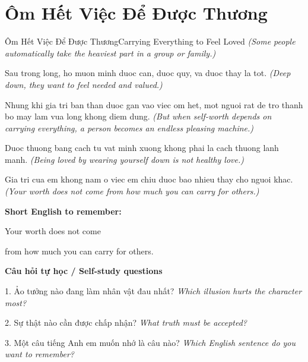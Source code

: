 \section{Ôm Hết Việc Để Được Thương}
\begin{truyen}{Ôm Hết Việc Để Được Thương}{Carrying Everything to Feel Loved}
\textit{(Some people automatically take the heaviest part in a group or family.)}

Sau trong long, ho muon minh duoc can, duoc quy, va duoc thay la tot.
\textit{(Deep down, they want to feel needed and valued.)}

Nhung khi gia tri ban than duoc gan vao viec om het, mot nguoi rat de tro thanh bo may lam vua long khong diem dung.
\textit{(But when self-worth depends on carrying everything, a person becomes an endless pleasing machine.)}

Duoc thuong bang cach tu vat minh xuong khong phai la cach thuong lanh manh.
\textit{(Being loved by wearing yourself down is not healthy love.)}

\end{truyen}

\begin{baihoc}
Gia tri cua em khong nam o viec em chiu duoc bao nhieu thay cho nguoi khac.
\textit{(Your worth does not come from how much you can carry for others.)}
\end{baihoc}

\begin{ghinhoanh}
\textbf{Short English to remember:}

Your worth does not come

from how much you can carry for others.

\end{ghinhoanh}

\begin{tuhocnhanh}
\textbf{Câu hỏi tự học / Self-study questions}

1. Ảo tưởng nào đang làm nhân vật đau nhất? \textit{Which illusion hurts the character most?}

2. Sự thật nào cần được chấp nhận? \textit{What truth must be accepted?}

3. Một câu tiếng Anh em muốn nhớ là câu nào? \textit{Which English sentence do you want to remember?}
\end{tuhocnhanh}
\ngancach

